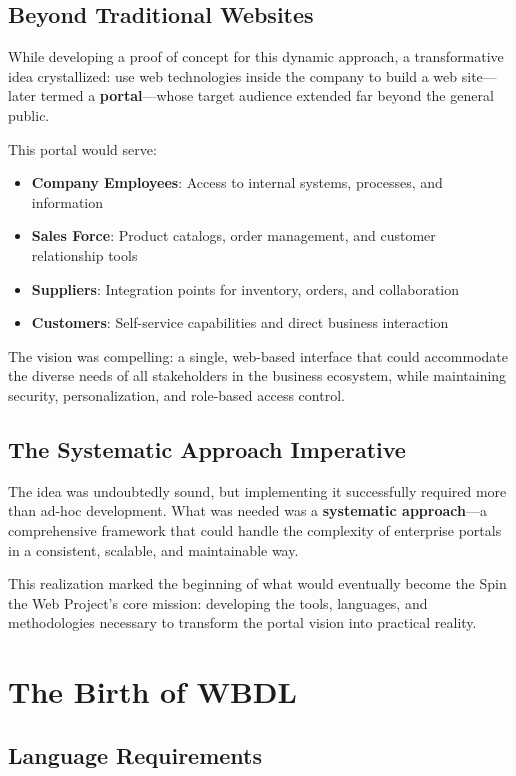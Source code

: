 \subsection{Beyond Traditional Websites}

While developing a proof of concept for this dynamic approach, a transformative idea crystallized: use web technologies inside the company to build a web site—later termed a \textbf{portal}—whose target audience extended far beyond the general public.

This portal would serve:
\begin{itemize}
\item \textbf{Company Employees}: Access to internal systems, processes, and information
\item \textbf{Sales Force}: Product catalogs, order management, and customer relationship tools
\item \textbf{Suppliers}: Integration points for inventory, orders, and collaboration
\item \textbf{Customers}: Self-service capabilities and direct business interaction
\end{itemize}

The vision was compelling: a single, web-based interface that could accommodate the diverse needs of all stakeholders in the business ecosystem, while maintaining security, personalization, and role-based access control.

\subsection{The Systematic Approach Imperative}

The idea was undoubtedly sound, but implementing it successfully required more than ad-hoc development. What was needed was a \textbf{systematic approach}—a comprehensive framework that could handle the complexity of enterprise portals in a consistent, scalable, and maintainable way.

This realization marked the beginning of what would eventually become the Spin the Web Project's core mission: developing the tools, languages, and methodologies necessary to transform the portal vision into practical reality.

\section{The Birth of WBDL}

\subsection{Language Requirements}

